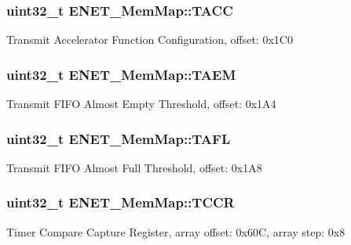 \subsubsection[{T\+A\+C\+C}]{\setlength{\rightskip}{0pt plus 5cm}uint32\+\_\+t E\+N\+E\+T\+\_\+\+Mem\+Map\+::\+T\+A\+C\+C}\label{struct_e_n_e_t___mem_map_a7215c1d9494a9cdba3959c6b7626e9c6}
Transmit Accelerator Function Configuration, offset\+: 0x1\+C0 \hypertarget{struct_e_n_e_t___mem_map_ae633a0daa87c4d55ec4f4b07a6a336cc}{}
\subsubsection[{T\+A\+E\+M}]{\setlength{\rightskip}{0pt plus 5cm}uint32\+\_\+t E\+N\+E\+T\+\_\+\+Mem\+Map\+::\+T\+A\+E\+M}\label{struct_e_n_e_t___mem_map_ae633a0daa87c4d55ec4f4b07a6a336cc}
Transmit F\+I\+F\+O Almost Empty Threshold, offset\+: 0x1\+A4 \hypertarget{struct_e_n_e_t___mem_map_a4229a0d53dc34b8f964fb5889860293d}{}
\subsubsection[{T\+A\+F\+L}]{\setlength{\rightskip}{0pt plus 5cm}uint32\+\_\+t E\+N\+E\+T\+\_\+\+Mem\+Map\+::\+T\+A\+F\+L}\label{struct_e_n_e_t___mem_map_a4229a0d53dc34b8f964fb5889860293d}
Transmit F\+I\+F\+O Almost Full Threshold, offset\+: 0x1\+A8 \hypertarget{struct_e_n_e_t___mem_map_a241fa51692e64ff3b02e6e953676fd95}{}
\subsubsection[{T\+C\+C\+R}]{\setlength{\rightskip}{0pt plus 5cm}uint32\+\_\+t E\+N\+E\+T\+\_\+\+Mem\+Map\+::\+T\+C\+C\+R}\label{struct_e_n_e_t___mem_map_a241fa51692e64ff3b02e6e953676fd95}
Timer Compare Capture Register, array offset\+: 0x60\+C, array step\+: 0x8 \hypertarget{struct_e_n_e_t___mem_map_ab9bb7ecf57ffae10f969d3771994d87e}{}
